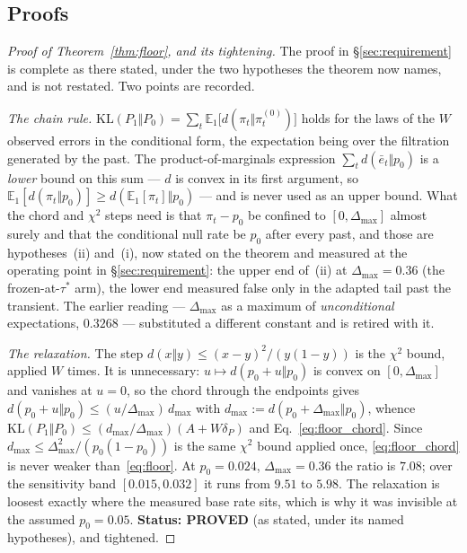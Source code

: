 \subsection{Proofs}\label{sec:prop3_proofs}

\begin{proof}[Proof of Theorem~\ref{thm:floor}, and its tightening]
  The proof in \S\ref{sec:requirement} is complete as there stated, under the
  two hypotheses the theorem now names, and is not restated. Two points are
  recorded.

  \emph{The chain rule.} $\mathrm{KL}(P_1 \Vert P_0) = \sum_t \mathbb{E}_1
  \bigl[d(\pi_t \Vert \pi_t^{(0)})\bigr]$ holds for the laws of
  the $W$ observed errors in the conditional form, the expectation being over
  the filtration generated by the past. The product-of-marginals expression
  $\sum_t d(\bar{e}_t \Vert p_0)$ is a \emph{lower} bound on this sum ---
  $d$ is convex in its first argument, so
  $\mathbb{E}_1[d(\pi_t \Vert p_0)] \ge d(\mathbb{E}_1[\pi_t] \Vert p_0)$ ---
  and is never used as an upper bound. What the chord and $\chi^2$ steps
  need is that $\pi_t - p_0$ be confined to $[0, \Delta_{\max}]$ almost
  surely and that the conditional null rate be $p_0$ after every past, and
  those are hypotheses~(ii) and~(i), now stated on the theorem and measured
  at the operating point in \S\ref{sec:requirement}: the upper end of~(ii)
  at $\Delta_{\max} = 0.36$ (the frozen-at-$\tau^*$ arm), the lower end
  measured false only in the adapted tail past the transient. The earlier
  reading --- $\Delta_{\max}$ as a maximum of \emph{unconditional}
  expectations, $0.3268$ --- substituted a different constant and is retired
  with it.

  \emph{The relaxation.} The step $d(x \Vert y) \le (x-y)^2/(y(1-y))$ is the
  $\chi^2$ bound, applied $W$ times. It is unnecessary: $u \mapsto
  d(p_0 + u \Vert p_0)$ is convex on $[0, \Delta_{\max}]$ and vanishes at
  $u = 0$, so the chord through the endpoints gives
  $d(p_0+u \Vert p_0) \le (u/\Delta_{\max})\,d_{\max}$ with $d_{\max} :=
  d(p_0 + \Delta_{\max} \Vert p_0)$, whence $\mathrm{KL}(P_1 \Vert P_0) \le
  (d_{\max}/\Delta_{\max})(A + W\delta_P)$ and Eq.~\eqref{eq:floor_chord}.
  Since $d_{\max} \le \Delta_{\max}^2/(p_0(1-p_0))$ is the same $\chi^2$ bound
  applied once, \eqref{eq:floor_chord} is never weaker
  than~\eqref{eq:floor}. At $p_0 = 0.024$, $\Delta_{\max} = 0.36$ the ratio
  is $7.08$; over the sensitivity band $[0.015, 0.032]$ it runs from $9.51$ to
  $5.98$. The relaxation is loosest exactly where the measured base rate sits,
  which is why it was invisible at the assumed $p_0 = 0.05$.
  \textbf{Status: PROVED} (as stated, under its named hypotheses), and
  tightened.
\end{proof}

